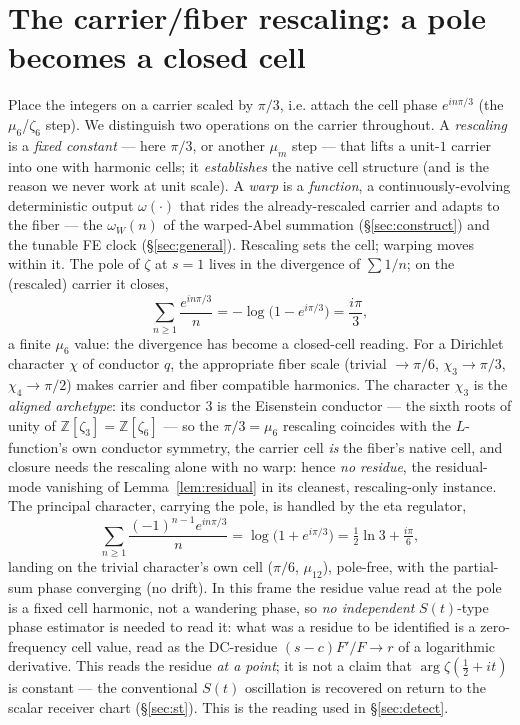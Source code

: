\documentclass[11pt]{article}
\theoremstyle{definition}
\begin{document}
\section{The carrier/fiber rescaling: a pole becomes a closed cell}\label{sec:carrier}

Place the integers on a carrier scaled by $\pi/3$, i.e. attach the cell phase $e^{in\pi/3}$ (the
$\mu_6$/$\zeta_6$ step). We distinguish two operations on the carrier throughout. A \emph{rescaling} is a
\emph{fixed constant} --- here $\pi/3$, or another $\mu_m$ step --- that lifts a unit-$1$ carrier into one
with harmonic cells; it \emph{establishes} the native cell structure (and is the reason we never work at
unit scale). A \emph{warp} is a \emph{function}, a continuously-evolving deterministic output
$\omega(\cdot)$ that rides the already-rescaled carrier and adapts to the fiber --- the $\omega_W(n)$ of the
warped-Abel summation (\S\ref{sec:construct}) and the tunable FE clock (\S\ref{sec:general}). Rescaling sets
the cell; warping moves within it. The pole of $\zeta$ at $s=1$ lives in the divergence of $\sum 1/n$; on
the (rescaled) carrier it closes,
\[
  \sum_{n\ge1}\frac{e^{in\pi/3}}{n}=-\log\!\big(1-e^{i\pi/3}\big)=\frac{i\pi}{3},
\]
a finite $\mu_6$ value: the divergence has become a closed-cell reading. For a Dirichlet character
$\chi$ of conductor $q$, the appropriate fiber scale (trivial $\to\pi/6$, $\chi_3\to\pi/3$,
$\chi_4\to\pi/2$) makes carrier and fiber compatible harmonics. The character $\chi_3$ is the
\emph{aligned archetype}: its conductor $3$ is the Eisenstein conductor --- the sixth roots of unity of
$\mathbb Z[\zeta_3]=\mathbb Z[\zeta_6]$ --- so the $\pi/3=\mu_6$ rescaling coincides with the $L$-function's
own conductor symmetry, the carrier cell \emph{is} the fiber's native cell, and closure needs the rescaling
alone with no warp: hence \emph{no residue}, the residual-mode vanishing of Lemma~\ref{lem:residual} in its
cleanest, rescaling-only instance. The principal character, carrying the
pole, is handled by the eta regulator,
\[
  \sum_{n\ge1}\frac{(-1)^{n-1}e^{in\pi/3}}{n}=\log\!\big(1+e^{i\pi/3}\big)=\tfrac12\ln3+\tfrac{i\pi}{6},
\]
landing on the trivial character's own cell ($\pi/6$, $\mu_{12}$), pole-free, with the partial-sum
phase converging (no drift). In this frame the residue value read at the pole is a fixed cell harmonic, not a
wandering phase, so \emph{no independent} $S(t)$-type phase estimator is needed to read it: what was a residue
to be identified is a zero-frequency cell value, read as the DC-residue $(s-c)F'/F\to r$ of a logarithmic
derivative. This reads the residue \emph{at a point}; it is not a claim that $\arg\zeta(\tfrac12+it)$ is
constant --- the conventional $S(t)$ oscillation is recovered on return to the scalar receiver chart
(\S\ref{sec:st}). This is the reading used in \S\ref{sec:detect}.
\end{document}
